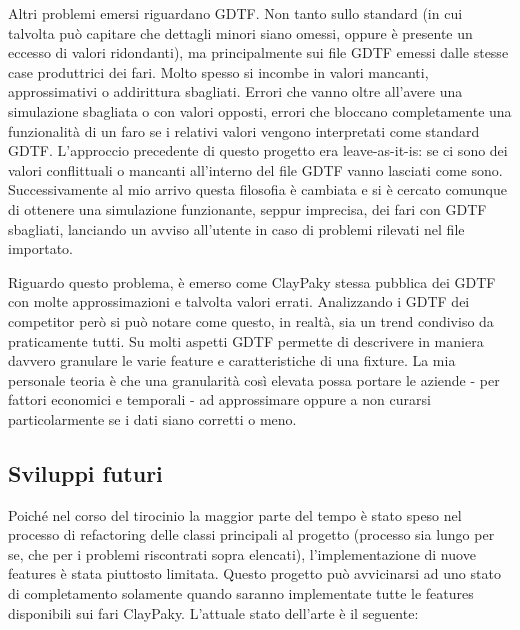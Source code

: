 \documentclass[main.tex]{subfiles}
\begin{document}
Altri problemi emersi riguardano GDTF. Non tanto sullo standard (in cui talvolta può capitare che dettagli minori siano omessi, oppure è presente un eccesso di valori ridondanti), ma principalmente sui file GDTF emessi dalle stesse case produttrici dei fari. Molto spesso si incombe in valori mancanti, approssimativi o addirittura sbagliati. Errori che vanno oltre all'avere una simulazione sbagliata o con valori opposti, errori che bloccano completamente una funzionalità di un faro se i relativi valori vengono interpretati come standard GDTF. L'approccio precedente di questo progetto era leave-as-it-is: se ci sono dei valori conflittuali o mancanti all'interno del file GDTF vanno lasciati come sono. Successivamente al mio arrivo questa filosofia è cambiata e si è cercato comunque di ottenere una simulazione funzionante, seppur imprecisa, dei fari con GDTF sbagliati, lanciando un avviso all'utente in caso di problemi rilevati nel file importato.

Riguardo questo problema, è emerso come ClayPaky stessa pubblica dei GDTF con molte approssimazioni e talvolta valori errati. Analizzando i GDTF dei competitor però si può notare come questo, in realtà, sia un trend condiviso da praticamente tutti. Su molti aspetti GDTF permette di descrivere in maniera davvero granulare le varie feature e caratteristiche di una fixture. La mia personale teoria è che una granularità così elevata possa portare le aziende - per fattori economici e temporali - ad approssimare oppure a non curarsi particolarmente se i dati siano corretti o meno. 

\subsection{Sviluppi futuri}\label{subsec:6_newDevelops}
Poiché nel corso del tirocinio la maggior parte del tempo è stato speso nel processo di refactoring delle classi principali al progetto (processo sia lungo per se, che per i problemi riscontrati sopra elencati), l'implementazione di nuove features è stata piuttosto limitata. Questo progetto può avvicinarsi ad uno stato di completamento solamente quando saranno implementate tutte le features disponibili sui fari ClayPaky. L'attuale stato dell'arte è il seguente: \newline
\end{document}

